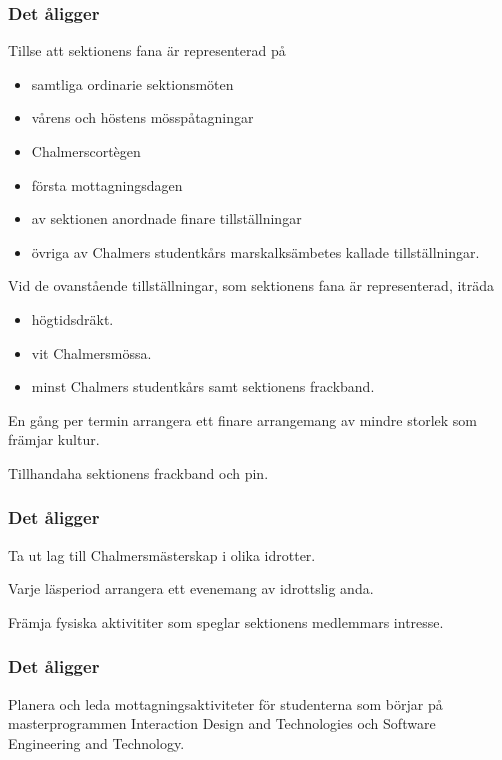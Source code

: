\subsubsection{Det åligger \FANBARERIT}
\label{sec:fanbarerit:function}
\begin{att}
	\item Tillse att sektionens fana är representerad på
	\begin{itemize}
		\item samtliga ordinarie sektionsmöten
		\item vårens och höstens mösspåtagningar
		\item Chalmerscortègen
		\item första mottagningsdagen
		\item av sektionen anordnade finare tillställningar
		\item övriga av Chalmers studentkårs marskalksämbetes kallade tillställningar.
	\end{itemize}
	\item Vid de ovanstående tillställningar, som sektionens fana är representerad, iträda
	\begin{itemize}
		\item högtidsdräkt.
		\item vit Chalmersmössa.
		\item minst Chalmers studentkårs samt sektionens frackband.
	\end{itemize}
	\item En gång per termin arrangera ett finare arrangemang av mindre storlek som främjar kultur.
	\item Tillhandaha sektionens frackband och pin.
\end{att}

\subsubsection{Det åligger \FRITID}
\begin{att}
	\item Ta ut lag till Chalmersmästerskap i olika idrotter.
	\item Varje läsperiod arrangera ett evenemang av idrottslig anda.
	\item Främja fysiska aktivititer som speglar sektionens medlemmars intresse.
\end{att}

\subsubsection{Det åligger \MRCIT}
\begin{att}
  \item Planera och leda mottagningsaktiviteter för studenterna som börjar på masterprogrammen Interaction Design and Technologies och Software Engineering and Technology.
\end{att}

